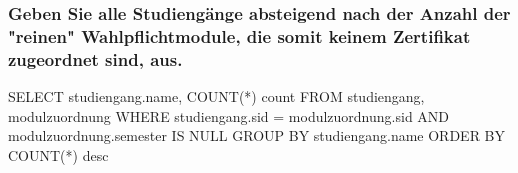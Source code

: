     \subsubsection{Geben Sie alle Studiengänge absteigend nach der Anzahl der "reinen" Wahlpflichtmodule, die somit keinem Zertifikat zugeordnet sind, aus.}
    \begin{sql}
        SELECT studiengang.name, COUNT(*) count
            FROM studiengang, modulzuordnung
            WHERE studiengang.sid = modulzuordnung.sid
            AND modulzuordnung.semester IS NULL
            GROUP BY studiengang.name
            ORDER BY COUNT(*) desc
    \end{sql}

